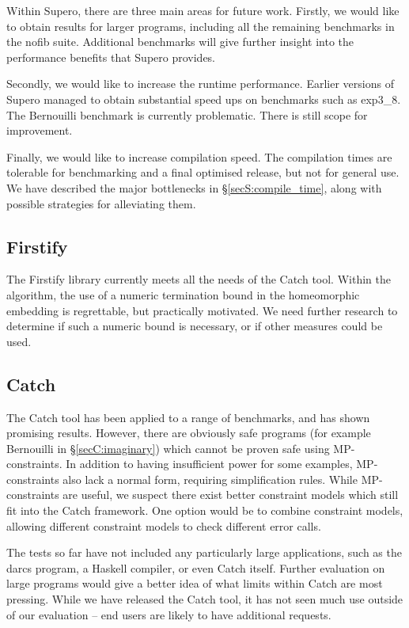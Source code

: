 Within Supero, there are three main areas for future work. Firstly, we would like to obtain results for larger programs, including all the remaining benchmarks in the nofib suite. Additional benchmarks will give further insight into the performance benefits that Supero provides.

Secondly, we would like to increase the runtime performance. Earlier versions of Supero \cite{me:supero_ifl} managed to obtain substantial speed ups on benchmarks such as exp3\_8. The Bernouilli benchmark is currently problematic. There is still scope for improvement.

Finally, we would like to increase compilation speed. The compilation times are tolerable for benchmarking and a final optimised release, but not for general use. We have described the major bottlenecks in \S\ref{secS:compile_time}, along with possible strategies for alleviating them.

\subsection{Firstify}

The Firstify library currently meets all the needs of the Catch tool. Within the algorithm, the use of a numeric termination bound in the homeomorphic embedding is regrettable, but practically motivated. We need further research to determine if such a numeric bound is necessary, or if other measures could be used.

\subsection{Catch}

The Catch tool has been applied to a range of benchmarks, and has shown promising results. However, there are obviously safe programs (for example Bernouilli in \S\ref{secC:imaginary}) which cannot be proven safe using MP-constraints. In addition to having insufficient power for some examples, MP-constraints also lack a normal form, requiring simplification rules. While MP-constraints are useful, we suspect there exist better constraint models which still fit into the Catch framework. One option would be to combine constraint models, allowing different constraint models to check different error calls.

The tests so far have not included any particularly large applications, such as the darcs program, a Haskell compiler, or even Catch itself. Further evaluation on large programs would give a better idea of what limits within Catch are most pressing. While we have released the Catch tool, it has not seen much use outside of our evaluation -- end users are likely to have additional requests.

